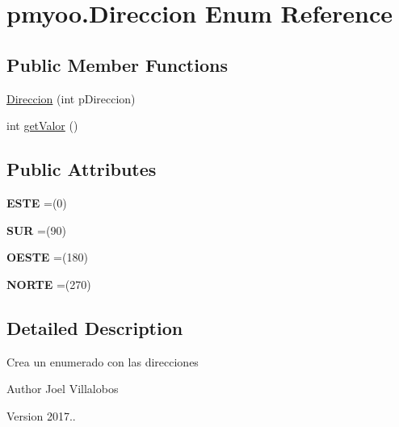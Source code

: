\hypertarget{enumpmyoo_1_1_direccion}{}\section{pmyoo.\+Direccion Enum Reference}
\label{enumpmyoo_1_1_direccion}
\subsection*{Public Member Functions}
\begin{DoxyCompactItemize}
\item 
\mbox{\hyperlink{enumpmyoo_1_1_direccion_a9b65d1f2611f2530d3acee9a95a9cd81}{Direccion}} (int p\+Direccion)
\item 
int \mbox{\hyperlink{enumpmyoo_1_1_direccion_a939a949b6dc8128254357b4f51f745a7}{get\+Valor}} ()
\end{DoxyCompactItemize}
\subsection*{Public Attributes}
\begin{DoxyCompactItemize}
\item 
\mbox{\label{enumpmyoo_1_1_direccion_a975fc7110f75baee95446c2780984031}} 
{\bfseries E\+S\+TE} =(0)
\item 
\mbox{\label{enumpmyoo_1_1_direccion_a7e92ffb791db7610b94d3f9ec23841e2}} 
{\bfseries S\+UR} =(90)
\item 
\mbox{\label{enumpmyoo_1_1_direccion_ac791a00a34df4bc1ec16c3fef9092511}} 
{\bfseries O\+E\+S\+TE} =(180)
\item 
\mbox{\label{enumpmyoo_1_1_direccion_a7f3f36cee961762f4dbcbcf91167b565}} 
{\bfseries N\+O\+R\+TE} =(270)
\end{DoxyCompactItemize}


\subsection{Detailed Description}
Crea un enumerado con las direcciones \begin{DoxyAuthor}{Author}
Joel Villalobos 
\end{DoxyAuthor}
\begin{DoxyVersion}{Version}
2017.. 
\end{DoxyVersion}


